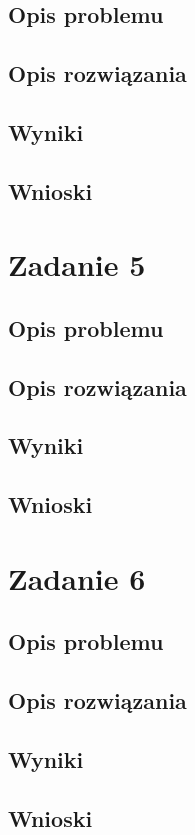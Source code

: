 \documentclass{classrep}
\begin{document}
	\subsection{Opis problemu}
	\subsection{Opis rozwiązania}
	\subsection{Wyniki}
	\subsection{Wnioski}
\section{Zadanie 5}
	\subsection{Opis problemu}
	\subsection{Opis rozwiązania}
	\subsection{Wyniki}
	\subsection{Wnioski}
\section{Zadanie 6}
	\subsection{Opis problemu}
	\subsection{Opis rozwiązania}
	\subsection{Wyniki}
	\subsection{Wnioski}
\end{document}
